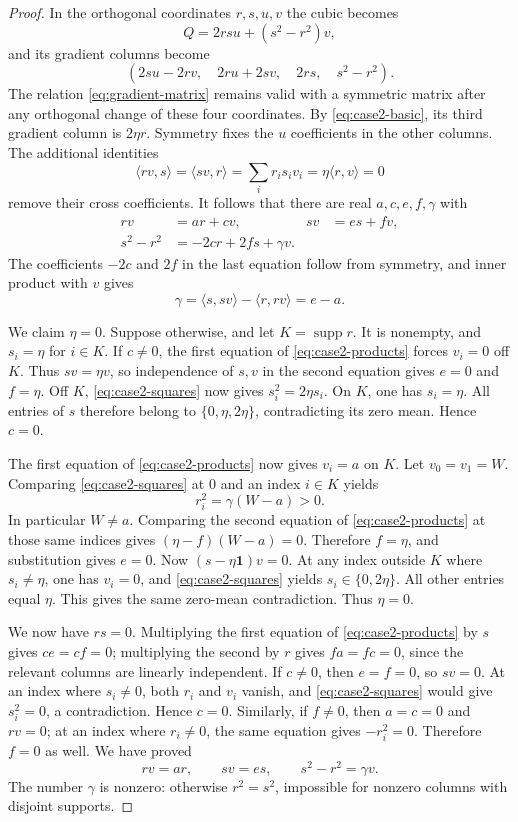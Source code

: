 \documentclass[11pt,reqno]{amsart}
\theoremstyle{definition}
\theoremstyle{remark}
\numberwithin{equation}{section}
\newcommand{\one}{\mathbf 1}
\newcommand{\ip}[2]{\langle #1,#2\rangle}
\DeclareMathOperator{\supp}{supp}
\begin{document}
\begin{proof}
In the orthogonal coordinates $r,s,u,v$ the cubic becomes
\[
 Q=2rsu+(s^2-r^2)v,
\]
and its gradient columns become
\[
 (2su-2rv,\quad 2ru+2sv,\quad 2rs,\quad s^2-r^2).
\]
The relation \eqref{eq:gradient-matrix} remains valid with a
symmetric matrix after any orthogonal change of these four
coordinates. By \eqref{eq:case2-basic}, its third gradient column
is $2\eta r$. Symmetry fixes the $u$ coefficients in the other
columns. The additional identities
\[
 \ip{rv}{s}=\ip{sv}{r}=\sum_i r_is_iv_i
                         =\eta\ip r v=0
\]
remove their cross coefficients. It follows that there are real
$a,c,e,f,\gamma$ with
\begin{align}
 rv&=a r+c v,& sv&=e s+f v,\label{eq:case2-products}\\
 s^2-r^2&=-2c r+2f s+\gamma v.
                  \label{eq:case2-squares}
\end{align}
The coefficients $-2c$ and $2f$ in the last equation follow from
symmetry, and inner product with $v$ gives
\begin{equation}\label{eq:case2-gamma}
 \gamma=\ip s{sv}-\ip r{rv}=e-a.
\end{equation}

We claim $\eta=0$. Suppose otherwise, and let $K=\supp r$.
It is nonempty, and $s_i=\eta$ for $i\in K$.
If $c\ne0$, the first equation of \eqref{eq:case2-products}
forces $v_i=0$ off $K$. Thus $sv=\eta v$, so independence of
$s,v$ in the second equation gives $e=0$ and $f=\eta$.
Off $K$, \eqref{eq:case2-squares} now gives
$s_i^2=2\eta s_i$. On $K$, one has $s_i=\eta$.
All entries of $s$ therefore belong to $\{0,\eta,2\eta\}$,
contradicting its zero mean. Hence $c=0$.

The first equation of \eqref{eq:case2-products} now gives $v_i=a$
on $K$. Let $v_0=v_1=W$. Comparing
\eqref{eq:case2-squares} at $0$ and an index $i\in K$ yields
\[
 r_i^2=\gamma(W-a)>0.
\]
In particular $W\ne a$. Comparing the second equation of
\eqref{eq:case2-products} at those same indices gives
$(\eta-f)(W-a)=0$. Therefore $f=\eta$, and substitution gives
$e=0$. Now $(s-\eta\one)v=0$. At any index outside $K$ where
$s_i\ne\eta$, one has $v_i=0$, and
\eqref{eq:case2-squares} yields $s_i\in\{0,2\eta\}$.
All other entries equal $\eta$. This gives the same zero-mean
contradiction. Thus $\eta=0$.

We now have $rs=0$. Multiplying the first equation of
\eqref{eq:case2-products} by $s$ gives $ce=cf=0$;
multiplying the second by $r$ gives $fa=fc=0$, since the relevant
columns are linearly independent. If $c\ne0$, then $e=f=0$, so
$sv=0$. At an index where $s_i\ne0$, both $r_i$ and $v_i$ vanish,
and \eqref{eq:case2-squares} would give $s_i^2=0$, a contradiction.
Hence $c=0$. Similarly, if $f\ne0$, then $a=c=0$ and $rv=0$;
at an index where $r_i\ne0$, the same equation gives
$-r_i^2=0$. Therefore $f=0$ as well. We have proved
\begin{equation}\label{eq:case2-reduced}
 rv=a r,\qquad sv=e s,\qquad s^2-r^2=\gamma v.
\end{equation}
The number $\gamma$ is nonzero: otherwise $r^2=s^2$, impossible
for nonzero columns with disjoint supports.


\end{proof}
\end{document}
